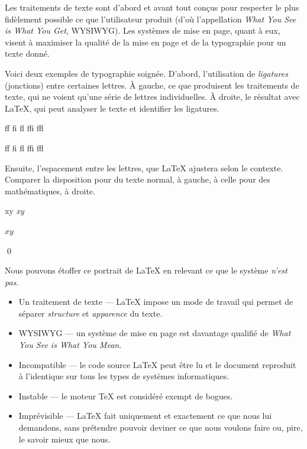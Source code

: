 \begin{exemple}
  Les traitements de texte sont d'abord et avant tout conçus pour
  respecter le plus fidèlement possible ce que l'utilisateur produit
  (d'où l'appellation \emph{What You See is What You Get}, WYSIWYG).
  Les systèmes de mise en page, quant à eux, visent à maximiser la
  qualité de la mise en page et de la typographie pour un texte donné.

  Voici deux exemples de typographie soignée. D'abord, l'utilisation
  de \emph{ligatures} (jonctions) entre certaines lettres. À gauche,
  ce que produisent les traitements de texte, qui ne voient qu'une
  série de lettres individuelles. À droite, le résultat avec {\LaTeX},
  qui peut analyser le texte et identifier les ligatures.
  \begin{demo}
    \centering
    \begin{minipage}{0.3\linewidth}
      \rmfamily f\/f \quad f\/i \quad f\/l \quad f\/f\/i \quad
      f\/f\/l
    \end{minipage}
    \qquad
    \begin{minipage}{0.3\linewidth}
      \rmfamily ff \quad fi \quad fl \quad ffi \quad ffl
    \end{minipage}
  \end{demo}

  Ensuite, l'espacement entre les lettres, que {\LaTeX} ajustera selon
  le contexte. Comparer la disposition pour du texte normal, à gauche,
  à celle pour des mathématiques, à droite.
  \begin{demo}
    \centering
    \begin{minipage}{0.3\linewidth}
      \rmfamily xy \quad \emph{xy}
    \end{minipage}
    \qquad
    \begin{minipage}{0.3\linewidth}
      $xy$
    \end{minipage}
  \end{demo}
  \qed
\end{exemple}

Nous pouvons étoffer ce portrait de {\LaTeX} en relevant ce que le
système \emph{n'est pas}.

\begin{itemize}
\item Un traitement de texte --- {\LaTeX} impose un mode de travail
  qui permet de séparer \emph{structure} et \emph{apparence} du texte.
\item WYSIWYG --- un système de mise en page est davantage qualifié de
  \emph{What You See is What You Mean}.
\item Incompatible --- le code source {\LaTeX} peut être lu et le
  document reproduit à l'identique sur tous les types de systèmes
  informatiques.
\item Instable --- le moteur {\TeX} est considéré exempt de bogues.
\item Imprévisible --- {\LaTeX} fait uniquement et exactement ce que
  nous lui demandons, sans prétendre pouvoir deviner ce que nous
  voulons faire ou, pire, le savoir mieux que nous.
\end{itemize}


